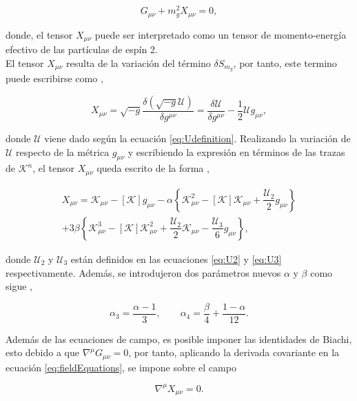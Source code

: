 \begin{equation}
    \label{eq:fieldEquations}
    G_{\mu\nu}+m_g^2X_{\mu\nu}=0,
\end{equation}

donde, el tensor $X_{\mu\nu}$ puede ser interpretado como un tensor de momento-energía efectivo de las partículas de espín 2.\\

El tensor $X_{\mu\nu}$ resulta de la variación del término $\delta S_{m_g}$, por tanto, este termino puede escribirse como \cite{BlackHoleSolutionIndeRGTMassiveGravity,StabilityOfSdSBlackHoles},

\begin{equation}
    X_{\mu\nu}=\sqrt{-g}\dfrac{\delta(\sqrt{-g}\mathcal{U})}{\delta g^{\mu\nu}}=\dfrac{\delta\mathcal{U}}{\delta g^{\mu\nu}}-\frac{1}{2}\mathcal{U}g_{\mu\nu}\label{XVar},
\end{equation}

donde $\mathcal{U}$ viene dado según la ecuación \eqref{eq:Udefinition}. Realizando la variación de $\mathcal{U}$ respecto de la métrica $g_{\mu\nu}$ y escribiendo la expresión en términos de las trazas de $\mathcal{K}^n$, el tensor $X_{\mu\nu}$ queda escrito de la forma  \cite{NoHairTheoremInQuasi},

\begin{equation}
    \begin{split}
        X_{\mu\nu}=\mathcal{K}_{\mu\nu}-[\mathcal{K}]g_{\mu\nu}-\alpha\left\{\mathcal{K}^2_{\mu\nu}-[\mathcal{K}]\mathcal{K}_{\mu\nu}+\dfrac{\mathcal{U}_2}{2}g_{\mu\nu}\right\}\\
        +3\beta\left\{\mathcal{K}^3_{\mu\nu}-[\mathcal{K}]\mathcal{K}^2_{\mu\nu}+\dfrac{\mathcal{U}_2}{2}\mathcal{K}_{\mu\nu}-\dfrac{\mathcal{U}_3}{6}g_{\mu\nu}\right\},
    \end{split}
\label{eq:TensorMomentoEnergíaEfectivo}
\end{equation}

donde $\mathcal{U}_2$ y $\mathcal{U}_3$ están definidos en las ecuaciones \eqref{eq:U2} y \eqref{eq:U3} respectivamente. Además, se introdujeron dos parámetros nuevos $\alpha$ y $\beta$ como sigue \cite{AClassOfBlackHoles},

\begin{equation}
    \alpha_3=\dfrac{\alpha-1}{3}, \qquad \alpha_4=\dfrac{\beta}{4}+\dfrac{1-\alpha}{12}.
\end{equation}

Además de las ecuaciones de campo, es posible imponer las identidades de Biachi, esto debido a que $\nabla^\mu G_{\mu\nu}=0$, por tanto, aplicando la derivada covariante en la ecuación \eqref{eq:fieldEquations}, se impone sobre el campo \cite{AClassOfBlackHoles, BardeenBlackHole}

\begin{equation}
    \nabla^{\mu}X_{\mu\nu}=0.
\end{equation}